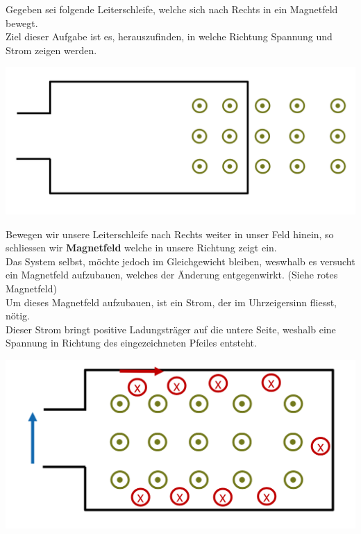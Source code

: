\beginbsp
Gegeben sei folgende Leiterschleife, welche sich nach Rechts in ein Magnetfeld bewegt. \\
Ziel dieser Aufgabe ist es, herauszufinden, in welche Richtung Spannung und Strom zeigen werden.
\begin{center}
  \includegraphics[scale=0.2]{img/ex-lenzsche-regel}
\end{center}

Bewegen wir unsere Leiterschleife nach Rechts weiter in unser Feld hinein, so schliessen wir \textbf{Magnetfeld} welche in unsere Richtung zeigt ein. \\
Das System selbst, möchte jedoch im Gleichgewicht bleiben, weswhalb es versucht ein Magnetfeld aufzubauen, welches der Änderung entgegenwirkt. (Siehe rotes Magnetfeld) \\
Um dieses Magnetfeld aufzubauen, ist ein Strom, der im Uhrzeigersinn fliesst, nötig. \\
Dieser Strom bringt positive Ladungsträger auf die untere Seite, weshalb eine Spannung in Richtung des eingezeichneten Pfeiles entsteht.


\begin{center}

  \includegraphics[scale=0.2]{img/ex-lenzsche-r-sol}
\end{center}
\iend

